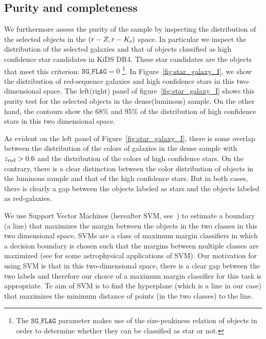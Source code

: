 \documentclass[fleqn,usenatbib,useAMS]{mnras}
\begin{document}
\subsection{Purity and completeness}\label{sec:purity}

We furthermore assess the purity of the sample by inspecting the distribution of the selected objects in the $(r-Z, r-K_{\rm s})$ space. 
In particular we inspect the distribution of the selected galaxies and that of objects classified as high confidence star candidates in KiDS DR4. These star candidates are the objects that meet this criterion: $\mathtt{SG\_FLAG}= 0$ \footnote{The $\mathtt{SG\_FLAG}$ parameter makes use of the size-peakiness relation of objects in order to determine whether they can be classified as star or not.}.
In Figure~\ref{fig:star_galaxy_I}, we show the distribution of red-sequence galaxies and high confidence stars in this two-dimensional space. 
The left(right) panel of figure~\ref{fig:star_galaxy_I} shows this purity test for the selected objects in the dense(luminous) sample. On the other hand, the contours show the 68\% and 95\% of the distribution of high confidence stars in this two dimensional space. 

As evident on the left panel of Figure~\ref{fig:star_galaxy_I}, there is some overlap between the distribution of the colors of galaxies in the dense sample with $z_{\rm red}>0.6$ and the distribution of the colors of high confidence stars. On the contrary, there is a clear distinction between the color distribution of objects in the luminous sample and that of the high confidence stars. But in both cases, there is clearly a gap between the objects labeled as stars and the objects labeled as red-galaxies.

We use Support Vector Machines (hereafter SVM, see~\citealt{cortes1995, cristianini2000, scholkopf2000}) to estimate a boundary (a line) that maximizes the margin between the objects in the two classes in this two dimensional space. SVMs are a class of maximum margin classifiers in which a decision boundary is chosen such that the margins between multiple classes are maximized (see \citealt{fadely2012, van2018} for some astrophysical applications of SVM). Our motivation for using SVM is that in this two-dimensional space, there is a clear gap between the two labels and therefore our choice of a maximum margin classifier for this task is appropriate. Te aim of SVM is to find the hyperplane (which is a line in our case) that maximizes the minimum distance of points (in the two classes) to the line. 
\end{document}

